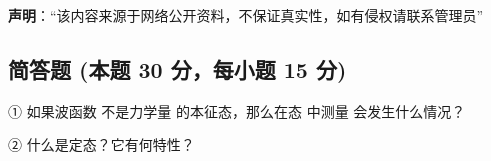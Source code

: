 
\textbf{声明}：“该内容来源于网络公开资料，不保证真实性，如有侵权请联系管理员”

\subsection{简答题 (本题 30 分，每小题 15 分)}

① 如果波函数 不是力学量 的本征态，那么在态 中测量 会发生什么情况？

② 什么是定态？它有何特性？